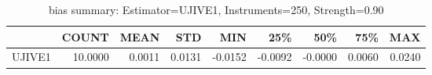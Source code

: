 \begin{table}[ht]
\centering
\caption{bias summary: Estimator=UJIVE1, Instruments=250, Strength=0.90}
\begin{tabular}{lrrrrrrrr}
\toprule
 & COUNT & MEAN & STD & MIN & 25\% & 50\% & 75\% & MAX \\
\midrule
UJIVE1 & 10.0000 & 0.0011 & 0.0131 & -0.0152 & -0.0092 & -0.0000 & 0.0060 & 0.0240 \\
\bottomrule
\end{tabular}
\end{table}
